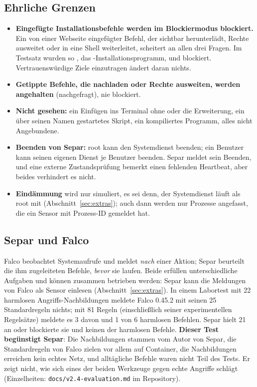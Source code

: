\documentclass[11pt,a4paper]{article}
\begin{document}
\subsection{Ehrliche Grenzen}
\begin{itemize}
  \item \textbf{Eingefügte Installationsbefehle werden im Blockiermodus blockiert.} Ein von einer
    Webseite eingefügter Befehl, der sichtbar herunterlädt, Rechte ausweitet oder in eine Shell
    weiterleitet, scheitert an allen drei Fragen. Im Testsatz wurden so , das
    -Installationsprogramm,  und  blockiert. Vertrauenswürdige
    Ziele einzutragen ändert daran nichts.
  \item \textbf{Getippte Befehle, die nachladen oder Rechte ausweiten, werden angehalten}
    (nachgefragt), nie blockiert.
  \item \textbf{Nicht gesehen:} ein Einfügen ins Terminal ohne  oder die
    Erweiterung, ein über seinen Namen gestartetes Skript, ein kompiliertes Programm, alles nicht
    Angebundene.
  \item \textbf{Beenden von Separ:} root kann den Systemdienst beenden; ein Benutzer kann seinen
    eigenen Dienst je Benutzer beenden. Separ meldet sein Beenden, und eine externe
    Zustandsprüfung bemerkt einen fehlenden Heartbeat, aber beides verhindert es nicht.
  \item \textbf{Eindämmung} wird nur simuliert, es sei denn, der Systemdienst läuft als root mit
     (Abschnitt~\ref{sec:extras}); auch dann werden nur Prozesse angefasst, die ein
    Sensor mit Prozess-ID gemeldet hat.
\end{itemize}

\subsection{Separ und Falco}
Falco beobachtet Systemaufrufe und meldet \emph{nach} einer Aktion; Separ beurteilt die ihm
zugeleiteten Befehle, \emph{bevor} sie laufen. Beide erfüllen unterschiedliche Aufgaben und können
zusammen betrieben werden: Separ kann die Meldungen von Falco als Sensor einlesen
(Abschnitt~\ref{sec:extras}). In einem Labortest mit 22 harmlosen Angriffs-Nachbildungen meldete
Falco 0.45.2 mit seinen 25 Standardregeln nichts; mit 81 Regeln (einschließlich seiner
experimentellen Regelsätze) meldete es 3 davon und 1 von 6 harmlosen Befehlen. Separ hielt 21 an
oder blockierte sie und keinen der harmlosen Befehle. \textbf{Dieser Test begünstigt Separ}: Die
Nachbildungen stammen vom Autor von Separ, die Standardregeln von Falco zielen vor allem auf
Container, die Nachbildungen erreichen kein echtes Netz, und alltägliche Befehle waren nicht Teil
des Tests. Er zeigt nicht, wie sich eines der beiden Werkzeuge gegen echte Angriffe schlägt
(Einzelheiten: \texttt{docs/v2.4-evaluation.md} im Repository).
\end{document}
